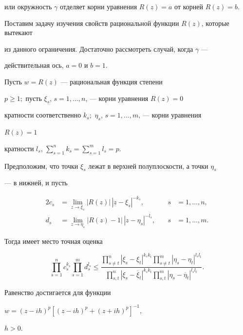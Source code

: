 или окружность $\gamma$ отделяет корни уравнения $R(z)=a$ от корней $R(z)=b$.


Поставим задачу изучения свойств рациональной функции $R(z)$, которые вытекают


из данного ограничения. Достаточно рассмотреть случай, когда $\gamma$ ---


действительная ось, $a=0$ и $b=1$.





\begin{thm}


Пусть $w=R(z)$ --- рациональная функция степени


$p\geq 1;$ пусть $\xi_s$, $s=1,\dotsc,n$, --- корни уравнения $R(z)=0$


кратности соответственно $k_s;$ $\eta_s$, $s=1,\dotsc,m$, --- корни уравнения


$R(z)=1$


кратности $l_s$, $\sum\limits_{s=1}^{n}k_s=\sum\limits_{s=1}^{m}l_s=p$.


Предположим, что точки $\xi_s$ лежат в верхней полуплоскости, а точки $\eta_s$


--- в нижней, и пусть


\begin{alignat*}{2}


c_s&=\lim_{z\to\xi_s}|R(z)|\,|z-\xi_s|^{-k_s}, &\quad s&=1,\dotsc,n,\\


%


d_s&=\lim_{z\to\eta_s}|R(z)-1|\,|z-\eta_s|^{-l_s}, &\quad s&=1,\dotsc,m.


\end{alignat*}


Тогда имеет место точная оценка


\begin{equation}


\prod\limits_{s=1}^{n}c_s^{k_s}\prod\limits_{s=1}^{m}d_s^{l_s}\leq\frac


{\prod\limits_{s\neq t}^{n}|\xi_s-\xi_t|^{k_sk_t}\prod\limits_{s\neq


t}^{m}|\eta_s-\eta_t|^{l_sl_t}}


{\prod\limits_{s, t}^{n}|\xi_s-


\overline{\xi}_t|^{k_sk_t}\prod\limits_{s, t}^{m}


|\eta_s-\overline{\eta}_t|^{l_sl_t}}.


\end{equation}


Равенство достигается для функции


$w=(z-ih)^p[(z-ih)^p+(z+ih)^p]^{-1},$


$h>0$.


\end{thm}





